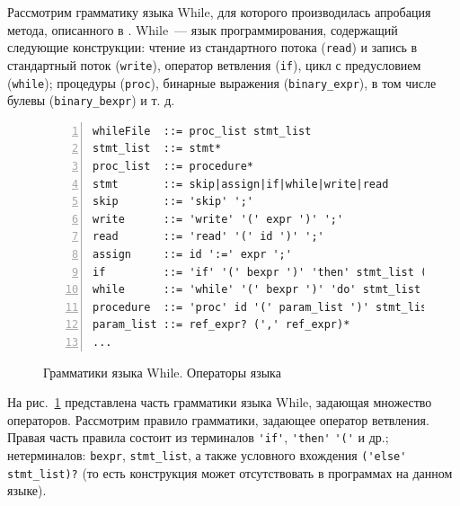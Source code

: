 Рассмотрим грамматику языка While, для которого производилась апробация метода, описанного в \cite{paper:while}.
While~--- язык программирования, содержащий следующие конструкции: чтение из стандартного потока (\lstinline{read}) и запись в стандартный поток (\lstinline{write}), оператор ветвления (\lstinline{if}), цикл с предусловием (\lstinline{while}); процедуры (\lstinline{proc}), бинарные выражения (\lstinline{binary_expr}), в том числе булевы (\lstinline{binary_bexpr}) и т. д.
\begin{figure}[h]
    \begin{lstlisting}[numbers=left, numbersep=3pt, basicstyle=\ttfamily\small, numberstyle=\tiny, frame=bottom, language={}]
whileFile  ::= proc_list stmt_list
stmt_list  ::= stmt*
proc_list  ::= procedure*
stmt       ::= skip|assign|if|while|write|read
skip       ::= 'skip' ';'
write      ::= 'write' '(' expr ')' ';'
read       ::= 'read' '(' id ')' ';'
assign     ::= id ':=' expr ';'
if         ::= 'if' '(' bexpr ')' 'then' stmt_list ('else' stmt_list)? 'fi'
while      ::= 'while' '(' bexpr ')' 'do' stmt_list 'od'
procedure  ::= 'proc' id '(' param_list ')' stmt_list 'endp'
param_list ::= ref_expr? (',' ref_expr)*
...
 \end{lstlisting}
    \caption{Грамматики языка While. Операторы языка}
    \label{ov:whileI}
\end{figure}
\noindent
На рис.~\ref{ov:whileI} представлена часть грамматики языка While, задающая множество операторов.
Рассмотрим правило грамматики, задающее оператор ветвления.
Правая часть правила состоит из терминалов \lstinline{'if'}, \lstinline{'then'} \lstinline{'('} и др.; нетерминалов: \lstinline{bexpr}, \lstinline{stmt_list}, а также условного вхождения \lstinline{('else' stmt_list)?} (то есть конструкция может отсутствовать в программах на данном языке).
